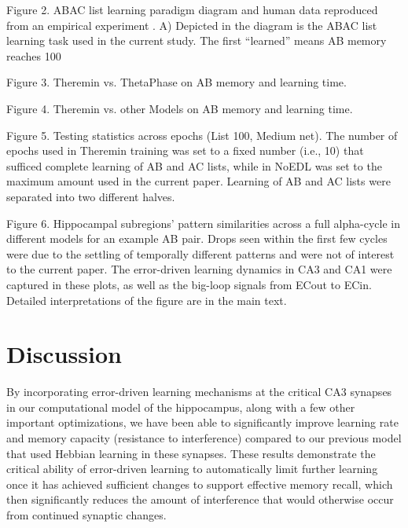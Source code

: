 \documentclass[11pt,twoside]{article}
\newif\myifpdf
\begin{document}
Figure 2. ABAC list learning paradigm diagram and human data reproduced from an empirical experiment \citep{BarnesUnderwood60}. A) Depicted in the diagram is the ABAC list learning task used in the current study. The first “learned” means AB memory reaches 100%

Figure 3. Theremin vs. ThetaPhase on AB memory and learning time. 


Figure 4. Theremin vs. other Models on AB memory and learning time.

Figure 5. Testing statistics across epochs (List 100, Medium net). The number of epochs used in Theremin training was set to a fixed number (i.e., 10) that sufficed complete learning of AB and AC lists, while in NoEDL was set to the maximum amount used in the current paper. Learning of AB and AC lists were separated into two different halves. 

Figure 6. Hippocampal subregions' pattern similarities across a full alpha-cycle in different models for an example AB pair. Drops seen within the first few cycles were due to the settling of temporally different patterns and were not of interest to the current paper. The error-driven learning dynamics in CA3 and CA1 were captured in these plots, as well as the big-loop signals from ECout to ECin. Detailed interpretations of the figure are in the main text.


\section{Discussion}

By incorporating error-driven learning mechanisms at the critical CA3 synapses in our computational model of the hippocampus, along with a few other important optimizations, we have been able to significantly improve learning rate and memory capacity (resistance to interference) compared to our previous model that used Hebbian learning in these synapses. These results demonstrate the critical ability of error-driven learning to automatically limit further learning once it has achieved sufficient changes to support effective memory recall, which then significantly reduces the amount of interference that would otherwise occur from continued synaptic changes.
\end{document}
